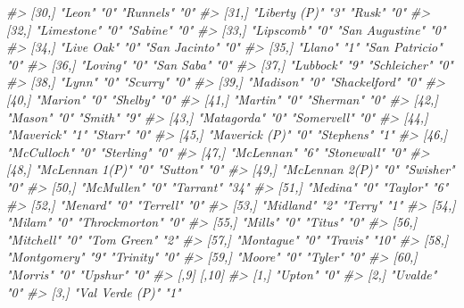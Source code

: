 \documentclass[
]{krantz}
\makeatletter
\newenvironment{Shaded}{\begin{snugshade}}{\end{snugshade}}
\newcommand{\CommentTok}[1]{\textcolor[rgb]{0.37,0.37,0.37}{\textit{#1}}}
\newenvironment{kframe}{%
\medskip{}
\setlength{\fboxsep}{.8em}
 \def\at@end@of@kframe{}%
 \ifinner\ifhmode%
  \def\at@end@of@kframe{\end{minipage}}%
  \begin{minipage}{\columnwidth}%
 \fi\fi%
 \def\FrameCommand##1{\hskip\@totalleftmargin \hskip-\fboxsep
 \colorbox{shadecolor}{##1}\hskip-\fboxsep
     \hskip-\linewidth \hskip-\@totalleftmargin \hskip\columnwidth}%
 \MakeFramed {\advance\hsize-\width
   \@totalleftmargin\z@ \linewidth\hsize
   \@setminipage}}%
 {\par\unskip\endMakeFramed%
 \at@end@of@kframe}
\renewenvironment{Shaded}{\begin{kframe}}{\end{kframe}}
\makeatother
\begin{document}
\begin{Shaded}
\begin{Highlighting}[]
\CommentTok{\#\textgreater{} [30,] "Leon"          "0"  "Runnels"       "0" }
\CommentTok{\#\textgreater{} [31,] "Liberty (P)"   "3"  "Rusk"          "0" }
\CommentTok{\#\textgreater{} [32,] "Limestone"     "0"  "Sabine"        "0" }
\CommentTok{\#\textgreater{} [33,] "Lipscomb"      "0"  "San Augustine" "0" }
\CommentTok{\#\textgreater{} [34,] "Live Oak"      "0"  "San Jacinto"   "0" }
\CommentTok{\#\textgreater{} [35,] "Llano"         "1"  "San Patricio"  "0" }
\CommentTok{\#\textgreater{} [36,] "Loving"        "0"  "San Saba"      "0" }
\CommentTok{\#\textgreater{} [37,] "Lubbock"       "9"  "Schleicher"    "0" }
\CommentTok{\#\textgreater{} [38,] "Lynn"          "0"  "Scurry"        "0" }
\CommentTok{\#\textgreater{} [39,] "Madison"       "0"  "Shackelford"   "0" }
\CommentTok{\#\textgreater{} [40,] "Marion"        "0"  "Shelby"        "0" }
\CommentTok{\#\textgreater{} [41,] "Martin"        "0"  "Sherman"       "0" }
\CommentTok{\#\textgreater{} [42,] "Mason"         "0"  "Smith"         "9" }
\CommentTok{\#\textgreater{} [43,] "Matagorda"     "0"  "Somervell"     "0" }
\CommentTok{\#\textgreater{} [44,] "Maverick"      "1"  "Starr"         "0" }
\CommentTok{\#\textgreater{} [45,] "Maverick (P)"  "0"  "Stephens"      "1" }
\CommentTok{\#\textgreater{} [46,] "McCulloch"     "0"  "Sterling"      "0" }
\CommentTok{\#\textgreater{} [47,] "McLennan"      "6"  "Stonewall"     "0" }
\CommentTok{\#\textgreater{} [48,] "McLennan 1(P)" "0"  "Sutton"        "0" }
\CommentTok{\#\textgreater{} [49,] "McLennan 2(P)" "0"  "Swisher"       "0" }
\CommentTok{\#\textgreater{} [50,] "McMullen"      "0"  "Tarrant"       "34"}
\CommentTok{\#\textgreater{} [51,] "Medina"        "0"  "Taylor"        "6" }
\CommentTok{\#\textgreater{} [52,] "Menard"        "0"  "Terrell"       "0" }
\CommentTok{\#\textgreater{} [53,] "Midland"       "2"  "Terry"         "1" }
\CommentTok{\#\textgreater{} [54,] "Milam"         "0"  "Throckmorton"  "0" }
\CommentTok{\#\textgreater{} [55,] "Mills"         "0"  "Titus"         "0" }
\CommentTok{\#\textgreater{} [56,] "Mitchell"      "0"  "Tom Green"     "2" }
\CommentTok{\#\textgreater{} [57,] "Montague"      "0"  "Travis"        "10"}
\CommentTok{\#\textgreater{} [58,] "Montgomery"    "9"  "Trinity"       "0" }
\CommentTok{\#\textgreater{} [59,] "Moore"         "0"  "Tyler"         "0" }
\CommentTok{\#\textgreater{} [60,] "Morris"        "0"  "Upshur"        "0" }
\CommentTok{\#\textgreater{}       [,9]            [,10]}
\CommentTok{\#\textgreater{}  [1,] "Upton"         "0"  }
\CommentTok{\#\textgreater{}  [2,] "Uvalde"        "0"  }
\CommentTok{\#\textgreater{}  [3,] "Val Verde (P)" "1"  }

\end{Highlighting}
\end{Shaded}
\end{document}

